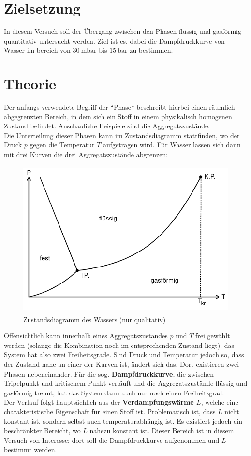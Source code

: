 \section*{Zielsetzung}
\label{sec:Zielsetzung}
In diesem Versuch soll der Übergang zwischen den Phasen flüssig und gasförmig quantitativ
untersucht werden. Ziel ist es, dabei die Dampfdruckkurve von Wasser im bereich von
$\SI{30}{\milli\bar}$ bis $\SI{15}{\bar}$ zu bestimmen.

\section{Theorie}
\label{sec:Theorie}
Der anfangs verwendete Begriff der ``Phase`` beschreibt hierbei einen räumlich
abgegrenzten Bereich, in dem sich ein Stoff in einem physikalisch homogenen Zustand
befindet. Anschauliche Beispiele sind die Aggregatszustände.
\\
Die Unterteilung dieser Phasen kann im Zustandsdiagramm stattfinden, wo der Druck $p$
gegen die Temperatur $T$ aufgetragen wird. Für Wasser lassen sich dann mit drei Kurven
die drei Aggregatszustände abgrenzen:
\begin{figure}[H]
	\centering
	\includegraphics[height=8cm]{images/Zustandsdiagramm.png}
	\caption{Zustandsdiagramm des Wassers (nur qualitativ) \cite{anleitung}}
	\label{fig:zustandsdiagramm}
\end{figure}
\noindent
Offensichtlich kann innerhalb eines Aggregatszustandes $p$ und $T$ frei gewählt werden
(solange die Kombination noch im entsprechenden Zustand liegt), das System hat also zwei Freiheitsgrade.
Sind Druck und Temperatur jedoch so, dass der Zustand nahe an einer der Kurven ist, ändert
sich das. Dort existieren zwei Phasen nebeneinander. Für die sog. \textbf{Dampfdruckkurve}, die
zwischen Tripelpunkt und kritischem Punkt verläuft und die Aggregatszustände flüssig und
gasförmig trennt, hat das System dann auch nur noch einen Freiheitsgrad.
\\
Der Verlauf folgt hauptsächlich aus der \textbf{Verdampfungswärme $L$}, welche eine
charakteristische Eigenschaft für einen Stoff ist. Problematisch ist, dass $L$ nicht
konstant ist, sondern selbst auch temperaturabhängig ist. Es existiert jedoch ein
beschränkter Bereicht, wo $L$ nahezu konstant ist. Dieser Bereich ist in diesem Versuch
von Interesse; dort soll die Dampfdruckkurve aufgenommen und $L$ bestimmt werden.


